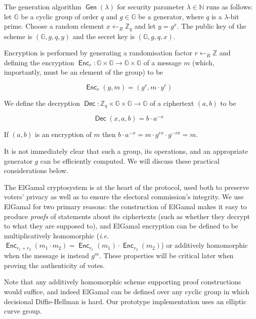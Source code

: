 \documentclass[12pt,a4paper]{article}
\DeclareMathOperator{\Gen}{\mathsf{Gen}}
\DeclareMathOperator{\Enc}{\mathsf{Enc}}
\DeclareMathOperator{\Dec}{\mathsf{Dec}}
\theoremstyle{definition}
\newcommand{\ie}{\textit{i.e. }}
\begin{document}
\begin{definition}\label{def-elgamal}
    The generation algorithm $\Gen(\lambda)$ for security parameter $\lambda\in\mathbb{N}$ runs as follows: let $\mathbb{G}$ be a cyclic group of order $q$ and $g\in\mathbb{G}$ be a generator, where $q$ is a $\lambda$-bit prime. Choose a random element $x\gets_R\mathbb{Z}_q$ and let $y=g^x$. 
    The public key of the scheme is $(\mathbb{G}, g, q, y)$ and the secret key is $(\mathbb{G}, g, q, x)$. 

    Encryption is performed by generating a randomisation factor $r\gets_R\mathbb{Z}$ and defining the encryption $\Enc_r:\mathbb{G}\times\mathbb{G}\rightarrow\mathbb{G}\times\mathbb{G}$ of a message $m$ (which, importantly, must be an element of the group) to be
    
    $$\Enc_r(y, m) = (g^r, m\cdot y^r)$$

    We define the decryption $\Dec:\mathbb{Z}_q\times\mathbb{G}\times\mathbb{G}\rightarrow \mathbb{G}$ of a ciphertext $(a, b)$ to be
    
    $$\Dec(x, a, b)=b\cdot a^{-x}$$

    If $(a, b)$ is an encryption of $m$ then $b\cdot a^{-x}=m\cdot g^{rx}\cdot g^{-rx}=m$.
\end{definition}

It is not immediately clear that such a group, its operations, and an appropriate generator $g$ can be efficiently computed. We will discuss these practical considerations below.

The ElGamal cryptosystem is at the heart of the protocol, used both to preserve voters' privacy as well as to ensure the electoral commission's integrity. We use ElGamal for two primary reasons: the construction of ElGamal makes it easy to produce \textit{proofs} of statements about its ciphertexts (such as whether they decrypt to what they are supposed to), and ElGamal encryption can be defined to be multiplicatively homomorphic (\ie $\Enc_{r_1+r_2}(m_1\cdot m_2)=\Enc_{r_1}(m_1)\cdot\Enc_{r_2}(m_2)$) or additively homomorphic when the message is instead $g^m$. These properties will be critical later when proving the authenticity of votes.

Note that any additively homomorphic scheme supporting proof constructions would suffice, and indeed ElGamal can be defined over any cyclic group in which decisional Diffie-Hellman is hard. Our prototype implementation uses an elliptic curve group.
\end{document}
